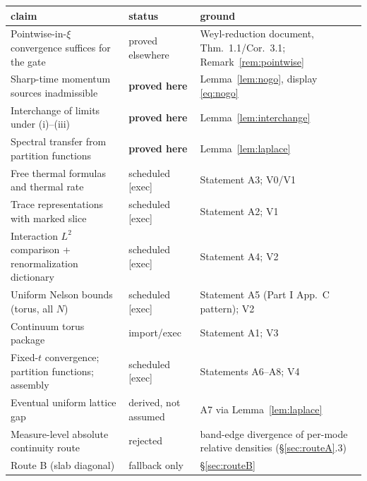 \documentclass[11pt,a4paper]{article}
\theoremstyle{plain}
\theoremstyle{definition}
\begin{document}
\begin{longtable}{P{5.2cm}P{2.2cm}P{6.4cm}}
\toprule
claim & status & ground \\
\midrule
\endhead
Pointwise-in-$\xi$ convergence suffices for the gate & proved elsewhere &
Weyl-reduction document, Thm.~1.1/Cor.~3.1; Remark~\ref{rem:pointwise} \\
Sharp-time momentum sources inadmissible & \textbf{proved here} &
Lemma~\ref{lem:nogo}, display \eqref{eq:nogo} \\
Interchange of limits under (i)--(iii) & \textbf{proved here} &
Lemma~\ref{lem:interchange} \\
Spectral transfer from partition functions & \textbf{proved here} &
Lemma~\ref{lem:laplace} \\
Free thermal formulas and thermal rate & scheduled [exec] & Statement A3; V0/V1 \\
Trace representations with marked slice & scheduled [exec] & Statement A2; V1 \\
Interaction $L^2$ comparison + renormalization dictionary & scheduled [exec] &
Statement A4; V2 \\
Uniform Nelson bounds (torus, all $N$) & scheduled [exec] & Statement A5 (Part I
App.~C pattern); V2 \\
Continuum torus package & import/exec & Statement A1; V3 \\
Fixed-$t$ convergence; partition functions; assembly & scheduled [exec] &
Statements A6--A8; V4 \\
Eventual uniform lattice gap & derived, not assumed & A7 via
Lemma~\ref{lem:laplace} \\
Measure-level absolute continuity route & rejected & band-edge divergence of
per-mode relative densities (\S\ref{sec:routeA}.3) \\
Route B (slab diagonal) & fallback only & \S\ref{sec:routeB} \\
\bottomrule
\end{longtable}
\end{document}
